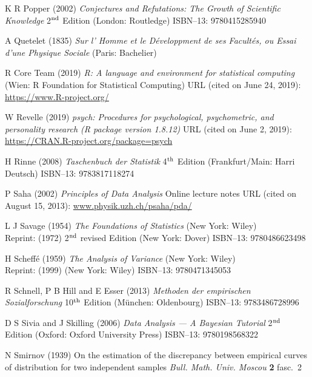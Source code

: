 \begin{thebibliography}{99}
K R Popper
(2002) \textit{Conjectures and Refutations: The Growth of
Scientific Knowledge} 2$^{\rm nd}$ Edition (London: Routledge)
ISBN--13: 9780415285940

A Quetelet
(1835) \textit{Sur l' Homme et le D\'{e}veloppment de ses 
Facult\'{e}s, ou Essai d'une Physique Sociale} (Paris: Bachelier)

R Core Team
(2019) \textit{R: A language and environment for statistical
computing} (Wien: R Foundation for Statistical Computing)
URL (cited on June 24, 2019): \href{https://www.R-project.org/}{https://www.R-project.org/}

W Revelle
(2019) \textit{psych: Procedures for psychological, psychometric,
and personality research (R package version 1.8.12)}
URL (cited on June 2, 2019): 
\href{https://CRAN.R-project.org/package=psych}{https://CRAN.R-project.org/package=psych}

H Rinne
(2008) \textit{Taschenbuch der Statistik}
4$^{\rm th}$ Edition (Frankfurt/Main: Harri Deutsch)
ISBN--13: 9783817118274

P Saha
(2002) \textit{Principles of Data Analysis} Online lecture notes
URL (cited on August 15, 2013):
\href{http://www.physik.uzh.ch/~psaha/pda/pda-a4.pdf}{www.physik.uzh.ch/\texttildelow psaha/pda/}

L J Savage
(1954) \textit{The Foundations of Statistics} (New York: Wiley)\\
Reprint: (1972) 2$^{\rm nd}$ revised Edition (New York: Dover) 
ISBN--13: 9780486623498

H Scheff\'{e}
(1959) \textit{The Analysis of Variance}
(New York: Wiley)\\
Reprint: (1999) (New York: Wiley) ISBN--13: 9780471345053

R Schnell, P B Hill and E Esser
(2013) \textit{Methoden der empirischen Sozialforschung} 10$^{\rm 
th}$ Edition (M\"{u}nchen: Oldenbourg) ISBN--13: 9783486728996

D S Sivia and J Skilling
(2006) \textit{Data Analysis --- A Bayesian Tutorial}
2$^{\rm nd}$ Edition (Oxford: Oxford University Press)
ISBN--13: 9780198568322

N Smirnov
(1939) On the estimation of the discrepancy between empirical 
curves of distribution for two independent samples
\textit{Bull. Math. Univ. Moscou} \textbf{2} fasc.~2


\end{thebibliography}
